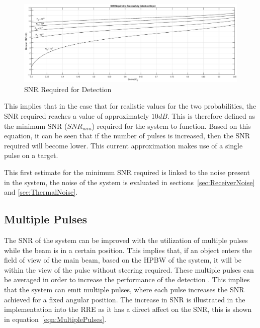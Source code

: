 \documentclass[11pt]{witseiepaper}
\begin{document}
\begin{center}
    \begin{figure}
        \includegraphics[width=\textwidth]{ProbabilityDetection.eps}
        \caption{SNR Required for Detection}
        \label{fig:SNRRequired}    
    \end{figure}
\end{center}

This implies that in the case that for realistic values for the two probabilities, the SNR required reaches a value of approximately $10 dB$.
This is therefore defined as the minimum SNR ($SNR_{min}$) required for the system to function.
Based on this equation, it can be seen that if the number of pulses is increased, then the SNR required will become lower. This current approximation makes use of a single pulse on a target.


This first estimate for the minimum SNR required is linked to the noise present in the system, the noise of the system is evaluated in sections~\ref{sec:ReceiverNoise} and \ref{sec:ThermalNoise}.

\subsection{Multiple Pulses} \label{sec:MultiplePulses}
The SNR of the system can be improved with the utilization of multiple pulses while the beam is in a certain position. This implies that, if an object enters the field of view of the main beam, based on the HPBW of the system, it will be within the view of the pulse without steering required.
These multiple pulses can be averaged in order to increase the performance of the detection \cite[p.~66]{radarHandbook}. This implies that the system can emit multiple pulses, where each pulse increases the SNR achieved for a fixed angular position.
The increase in SNR is illustrated in the implementation into the RRE as it has a direct affect on the SNR, this is shown in equation~\ref{eqn:MultiplePulses}.
\end{document}
